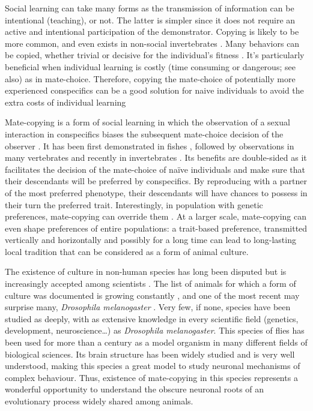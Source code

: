 \documentclass[a4paper, 12pt]{article}
\begin{document}
Social learning can take many forms as the transmission of information can be
intentional (teaching), or not. The latter is simpler since it does not require an active and intentional participation of the demonstrator. Copying is likely to be more common, and even exists in non-social invertebrates \parencite{coolen_social_2005, mark_how_2010}. Many behaviors can be copied, whether trivial \parencite{van_leeuwen_group-specific_2014} or decisive for the individual’s fitness \parencite{mery_public_2009}. It’s particularly beneficial when individual learning is costly (time consuming or dangerous; see also\parencite{webster_social_2008}) as in mate-choice. Therefore, copying the mate-choice of potentially more experienced conspecifics can be a good solution for naive individuals to avoid the extra costs of individual learning


Mate-copying is a form of social learning in which the observation of a sexual interaction in conspecifics biases the subsequent mate-choice decision of the observer \parencite{brown_fish_2011}. It has been first demonstrated in fishes \parencite{dugatkin_reversal_1992}, followed by observations in many vertebrates \parencite{galef_mate-choice_1998, yorzinski_same-sex_2010} and recently in invertebrates \parencite{mery_public_2009, fowler-finn_complexities_2015}. Its benefits are double-sided as it facilitates the decision of the mate-choice of naïve individuals and make sure that their descendants will be preferred by conspecifics. By reproducing with a partner of the most preferred phenotype, their descendants will have chances to possess in their turn the preferred trait.
Interestingly, in population with genetic preferences, mate-copying can override them \parencite{dugatkin_interface_1996, witte_male_1998}. At a larger scale, mate-copying can even shape preferences of entire populations: a trait-based preference, transmitted vertically and horizontally and possibly for a long time can lead to long-lasting local tradition that can be considered as a form of animal culture\parencite{brooks_importance_1998, danchin_cultural_2018}.

The existence of culture in non-human species has long been disputed \parencite{laland_animals_2003} but is increasingly accepted among scientists \parencite{aplin_experimentally_2015, whitehead_geneculture_2017}. The list of animals for which a form of culture was documented is growing constantly \parencite{van_schaik_orangutan_2003, thornton_multi_2010, whiten_culture_2017} , and one of the most recent may surprise many, \textit{Drosophila melanogaster} \parencite{danchin_cultural_2018}.  Very few, if none, species have been studied as deeply, with as extensive knowledge in every scientific field (genetics, development, neuroscience…) as \textit{Drosophila melanogaster}. This species of flies has been used for more than a century as a model organism in many different fields of biological sciences.  Its brain structure has been widely studied and is very well understood, making this species a great model to study neuronal mechanisms of complex behaviour. Thus, existence of mate-copying in this species represents a wonderful opportunity to understand the obscure neuronal roots of an evolutionary process widely shared among animals.  
\end{document}
